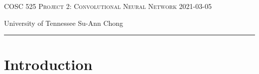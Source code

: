 \documentclass[12pt]{amsart}
\begin{document}
\thispagestyle{empty}

{\scshape COSC 525} \hfill {\scshape \large Project 2: Convolutional Neural Network} \hfill {\scshape 2021-03-05}

\smallskip 

{University of Tennessee} \hfill { Su-Ann Chong}

\smallskip

\hrule

\bigskip
\section{Introduction}


\end{document}
